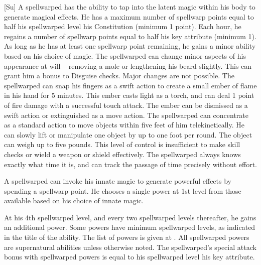 [Su]
A spellwarped has the ability to tap into the latent magic within his body to generate magical effects.
He has a maximum number of spellwarp points equal to half his spellwarped level \add his Constitution (minimum 1 point).
Each hour, he regains a number of spellwarp points equal to half his key attribute (minimum 1).
As long as he has at least one spellwarp point remaining, he gains a minor ability based on his choice of magic.
The spellwarped can change minor aspects of his appearance at will -- removing a mole or lengthening his beard slightly.
This can grant him a  bonus to Disguise checks.
Major changes are not possible.
The spellwarped can snap his fingers as a swift action to create a small ember of flame in his hand for 5 minutes.
This ember casts light as a torch, and can deal 1 point of fire damage with a successful touch attack.
The ember can be dismissed as a swift action or extinguished as a move action.
The spellwarped can concentrate as a standard action to move objects within five feet of him telekinetically.
He can slowly lift or manipulate one object by up to one foot per round.
The object can weigh up to five pounds.
This level of control is insufficient to make skill checks or wield a weapon or shield effectively.
The spellwarped always knows exactly what time it is, and can track the passage of time precisely without effort.

A spellwarped can invoke his innate magic to generate powerful effects by spending a spellwarp point.
He chooses a single power at 1st level from those available based on his choice of innate magic.

At his 4th spellwarped level, and every two spellwarped levels thereafter, he gains an additional power.
Some powers have minimum spellwarped levels, as indicated in the title of the ability.
The list of powers is given at .
All spellwarped powers are supernatural abilities unless otherwise noted.
The spellwarped's special attack bonus with spellwarped powers is equal to his spellwarped level \add his key attribute.


